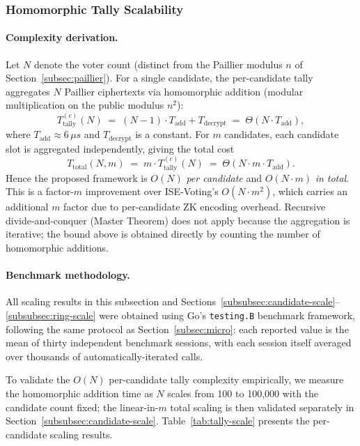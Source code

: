 \subsubsection{Homomorphic Tally Scalability}
\label{subsubsec:tally-scale}

\paragraph{Complexity derivation.} Let $N$ denote the voter count (distinct from the Paillier modulus $n$ of Section~\ref{subsec:paillier}). For a single candidate, the per-candidate tally aggregates $N$ Paillier ciphertexts via homomorphic addition (modular multiplication on the public modulus $n^{2}$):
\[
T_{\text{tally}}^{(c)}(N) \;=\; (N-1) \cdot T_{\text{add}} + T_{\text{decrypt}} \;=\; \Theta(N \cdot T_{\text{add}}),
\]
where $T_{\text{add}} \approx 6\,\mu s$ and $T_{\text{decrypt}}$ is a constant. For $m$ candidates, each candidate slot is aggregated independently, giving the total cost
\[
T_{\text{total}}(N, m) \;=\; m \cdot T_{\text{tally}}^{(c)}(N) \;=\; \Theta(N \cdot m \cdot T_{\text{add}}).
\]
Hence the proposed framework is $O(N)$ \emph{per candidate} and $O(N \cdot m)$ \emph{in total}. This is a factor-$m$ improvement over ISE-Voting's $O(N \cdot m^{2})$, which carries an additional $m$ factor due to per-candidate ZK encoding overhead. Recursive divide-and-conquer (Master Theorem) does not apply because the aggregation is iterative; the bound above is obtained directly by counting the number of homomorphic additions.

\paragraph{Benchmark methodology.} All scaling results in this subsection and Sections~\ref{subsubsec:candidate-scale}--\ref{subsubsec:ring-scale} were obtained using Go's \texttt{testing.B} benchmark framework, following the same protocol as Section~\ref{subsec:micro}: each reported value is the mean of thirty independent benchmark sessions, with each session itself averaged over thousands of automatically-iterated calls.

To validate the $O(N)$ per-candidate tally complexity empirically, we measure the homomorphic addition time as $N$ scales from 100 to 100{,}000 with the candidate count fixed; the linear-in-$m$ total scaling is then validated separately in Section~\ref{subsubsec:candidate-scale}. Table~\ref{tab:tally-scale} presents the per-candidate scaling results.

